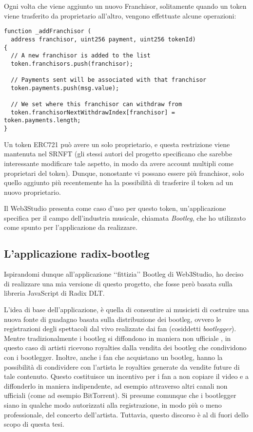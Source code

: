Ogni volta che viene aggiunto un nuovo Franchisor, solitamente quando un token viene trasferito da proprietario all'altro, vengono effettuate alcune operazioni:

\begin{lstlisting}[language=Solidity,numbers=none]
function _addFranchisor (
  address franchisor, uint256 payment, uint256 tokenId)
{
  // A new franchisor is added to the list
  token.franchisors.push(franchisor);

  // Payments sent will be associated with that franchisor
  token.payments.push(msg.value);

  // We set where this franchisor can withdraw from
  token.franchisorNextWithdrawIndex[franchisor] = token.payments.length;
}
\end{lstlisting}

Un token ERC721 può avere un solo proprietario, e questa restrizione viene mantenuta nel SRNFT (gli stessi autori del progetto specificano che sarebbe interessante modificare tale aspetto, in modo da avere account multipli come proprietari del token). Dunque, nonostante vi possano essere più franchisor, solo quello aggiunto più recentemente ha la possibilità di trasferire il token ad un nuovo proprietario.

Il Web3Studio presenta come caso d'uso per questo token, un'applicazione specifica per il campo dell'industria musicale, chiamata \textit{Bootleg}, che ho utilizzato come spunto per l'applicazione da realizzare.

\subsection{L'applicazione radix-bootleg}
Ispirandomi dunque all'applicazione ‘‘fittizia’’ Bootleg di Web3Studio, ho deciso di realizzare una mia versione di questo progetto, che fosse però basata sulla libreria JavaScript di Radix DLT. 

L'idea di base dell'applicazione, è quella di consentire ai musicisti di costruire una nuova fonte di guadagno basata sulla distribuzione dei bootleg, ovvero le registrazioni degli spettacoli dal vivo realizzate dai fan (cosiddetti \textit{bootlegger}). Mentre tradizionalmente i bootleg si diffondono in maniera non ufficiale \cite{K15}, in questo caso di artisti ricevono royalties dalla vendita dei bootleg che condividono con i bootlegger. Inoltre, anche i fan che acquistano un bootleg, hanno la possibilità di condividere con l'artista le royalties generate da vendite future di tale contenuto. Questo costituisce un incentivo per i fan a non copiare il video e a diffonderlo in maniera indipendente, ad esempio attraverso altri canali non ufficiali (come ad esempio BitTorrent). Si presume comunque che i bootlegger siano in qualche modo autorizzati alla registrazione, in modo più o meno professionale, del concerto dell'artista. Tuttavia, questo discorso è al di fuori dello scopo di questa tesi.

